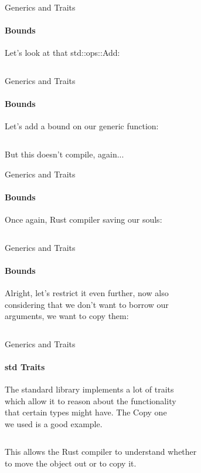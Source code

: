 \documentclass[usenames,dvipsnames,10pt,aspectratio=169]{beamer}
\begin{document}
\begin{frame}{Generics and Traits}
	\framesubtitle{Bounds}
	\large
	Let's look at that \textcolor{ucuyellow}{std::ops::Add}:
	\vspace{0.2cm}
	\inputminted[fontsize=\large]{rust}{code/generics7.rs}
\end{frame}

\begin{frame}{Generics and Traits}
	\framesubtitle{Bounds}
	\large
	Let's add a bound on our generic function:\\
	\vspace{0.2cm}
	\inputminted[fontsize=\large]{rust}{code/generics8.rs}
	\vspace{0.6cm}
	But this doesn't compile, again...
\end{frame}

\begin{frame}{Generics and Traits}
	\framesubtitle{Bounds}
	\large
	Once again, Rust compiler saving our souls:
	\vspace{0.2cm}
	\inputminted[fontsize=\normalsize]{rust}{code/generics9.rs}
\end{frame}

\begin{frame}{Generics and Traits}
	\framesubtitle{Bounds}
	\large
	Alright, let's restrict it even further, now also\\
	considering that we don't want to borrow our\\
	arguments, we want to copy them:\\
	\vspace{0.2cm}
	\inputminted[fontsize=\large]{rust}{code/generics10.rs}
\end{frame}

\begin{frame}{Generics and Traits}
	\framesubtitle{std Traits}
	\large
	The standard library implements a lot of traits\\
	which allow it to reason about the functionality\\
	that certain types might have. The \textcolor{ucuyellow}{Copy} one\\
	we used	is a good example.\\
	\vspace{0.2cm}
	\inputminted[fontsize=\large]{rust}{code/traits6.rs}
	\vspace{0.2cm}
	This allows the Rust compiler to understand whether\\
	to move the object out or to copy it. 	
\end{frame}
\end{document}

